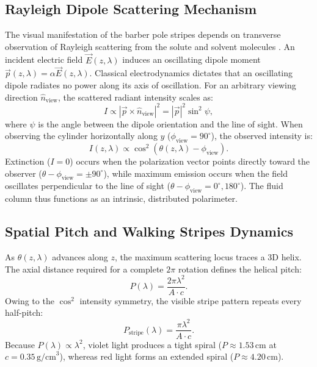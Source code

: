 \documentclass[twocolumn,10pt,a4paper]{article}
\begin{document}
\subsection{Rayleigh Dipole Scattering Mechanism}
The visual manifestation of the barber pole stripes depends on transverse observation of Rayleigh scattering from the solute and solvent molecules \cite{hecht2017, barron2004}. An incident electric field $\vec{E}(z, \lambda)$ induces an oscillating dipole moment $\vec{p}(z, \lambda) = \alpha \vec{E}(z, \lambda)$. Classical electrodynamics dictates that an oscillating dipole radiates no power along its axis of oscillation. For an arbitrary viewing direction $\hat{n}_{\text{view}}$, the scattered radiant intensity scales as:
\begin{equation}
  I \propto |\vec{p} \times \hat{n}_{\text{view}}|^2 = |\vec{p}|^2 \sin^2\psi,
  \label{eq:dipole_pattern}
\end{equation}
where $\psi$ is the angle between the dipole orientation and the line of sight. When observing the cylinder horizontally along $\hat{y}$ ($\phi_{\text{view}} = 90^\circ$), the observed intensity is:
\begin{equation}
  I(z, \lambda) \propto \cos^2\left(\theta(z, \lambda) - \phi_{\text{view}}\right).
  \label{eq:transverse_intensity}
\end{equation}
Extinction ($I = 0$) occurs when the polarization vector points directly toward the observer ($\theta - \phi_{\text{view}} = \pm 90^\circ$), while maximum emission occurs when the field oscillates perpendicular to the line of sight ($\theta - \phi_{\text{view}} = 0^\circ, 180^\circ$). The fluid column thus functions as an intrinsic, distributed polarimeter.

\subsection{Spatial Pitch and Walking Stripes Dynamics}
As $\theta(z, \lambda)$ advances along $z$, the maximum scattering locus traces a 3D helix. The axial distance required for a complete $2\pi$ rotation defines the helical pitch:
\begin{equation}
  P(\lambda) = \frac{2\pi \lambda^2}{A \cdot c}.
  \label{eq:pitch}
\end{equation}
Owing to the $\cos^2$ intensity symmetry, the visible stripe pattern repeats every half-pitch:
\begin{equation}
  P_{\text{stripe}}(\lambda) = \frac{\pi \lambda^2}{A \cdot c}.
  \label{eq:half_pitch}
\end{equation}
Because $P(\lambda) \propto \lambda^2$, violet light produces a tight spiral ($P \approx 1.53\,\text{cm}$ at $c = 0.35\,\text{g/cm}^3$), whereas red light forms an extended spiral ($P \approx 4.20\,\text{cm}$).
\end{document}
